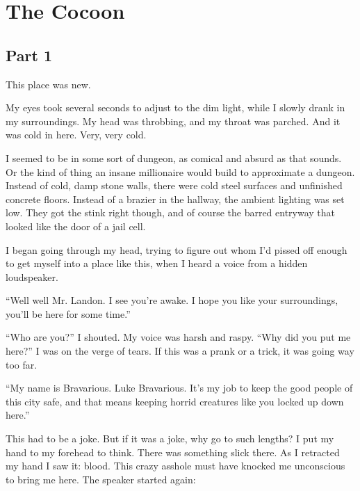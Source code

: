 \chapter{The Cocoon}

\section*{Part 1}

This place was new.



My eyes took several seconds to adjust to the dim light, while I
slowly drank in my surroundings. My head was throbbing, and my
throat was parched. And it was cold in here. Very, very cold.



I seemed to be in some sort of dungeon, as comical and absurd as
that sounds. Or the kind of thing an insane millionaire would build
to approximate a dungeon. Instead of cold, damp stone walls, there
were cold steel surfaces and unfinished concrete floors. Instead of
a brazier in the hallway, the ambient lighting was set low. They
got the stink right though, and of course the barred entryway that
looked like the door of a jail cell.



I began going through my head, trying to figure out whom I'd
pissed off enough to get myself into a place like this, when I
heard a voice from a hidden loudspeaker.



``Well well Mr. Landon. I see you're awake. I hope you
like your surroundings, you'll be here for some
time.''



``Who are you?'' I shouted. My voice was harsh and raspy.
``Why did you put me here?'' I was on the verge of tears.
If this was a prank or a trick, it was going way too far.



``My name is Bravarious. Luke Bravarious. It's my job to
keep the good people of this city safe, and that means keeping
horrid creatures like you locked up down here.''



This had to be a joke. But if it was a joke, why go to such
lengths? I put my hand to my forehead to think. There was something
slick there. As I retracted my hand I saw it: blood. This crazy
asshole must have knocked me unconscious to bring me here. The
speaker started again:



